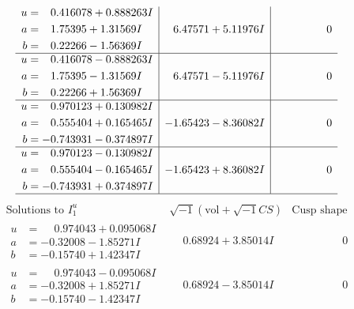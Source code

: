 \documentclass[1p]{elsarticle_modified}
\theoremstyle{definition}
\newcommand{\I}{\sqrt{-1}}
\begin{document}
$$\begin{array}{c|c|c}
\begin{aligned}
u &= \phantom{-}0.416078 + 0.888263 I \\
a &= \phantom{-}1.75395 + 1.31569 I \\
b &= \phantom{-}0.22266 - 1.56369 I\end{aligned}
 & \phantom{-}6.47571 + 5.11976 I & \phantom{-0.000000 } 0 \\ \hline\begin{aligned}
u &= \phantom{-}0.416078 - 0.888263 I \\
a &= \phantom{-}1.75395 - 1.31569 I \\
b &= \phantom{-}0.22266 + 1.56369 I\end{aligned}
 & \phantom{-}6.47571 - 5.11976 I & \phantom{-0.000000 } 0 \\ \hline\begin{aligned}
u &= \phantom{-}0.970123 + 0.130982 I \\
a &= \phantom{-}0.555404 + 0.165465 I \\
b &= -0.743931 - 0.374897 I\end{aligned}
 & -1.65423 - 8.36082 I & \phantom{-0.000000 } 0 \\ \hline\begin{aligned}
u &= \phantom{-}0.970123 - 0.130982 I \\
a &= \phantom{-}0.555404 - 0.165465 I \\
b &= -0.743931 + 0.374897 I\end{aligned}
 & -1.65423 + 8.36082 I & \phantom{-0.000000 } 0\\
 \hline 
 \end{array}$$\newpage$$\begin{array}{c|c|c}  
\text{Solutions to }I^u_{1}& \I (\text{vol} + \sqrt{-1}CS) & \text{Cusp shape}\\
 \hline 
\begin{aligned}
u &= \phantom{-}0.974043 + 0.095068 I \\
a &= -0.32008 - 1.85271 I \\
b &= -0.15740 + 1.42347 I\end{aligned}
 & \phantom{-}0.68924 + 3.85014 I & \phantom{-0.000000 } 0 \\ \hline\begin{aligned}
u &= \phantom{-}0.974043 - 0.095068 I \\
a &= -0.32008 + 1.85271 I \\
b &= -0.15740 - 1.42347 I\end{aligned}
 & \phantom{-}0.68924 - 3.85014 I & \phantom{-0.000000 } 0 \\ \hline\begin{aligned}

\end{aligned}
\end{array}$$
\end{document}
